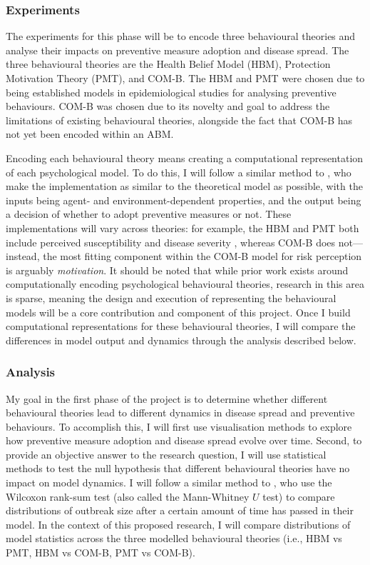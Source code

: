 \subsubsection{Experiments}

The experiments for this phase will be to encode three behavioural theories and analyse their impacts on preventive measure adoption and disease spread. The three behavioural theories are the Health Belief Model (HBM), Protection Motivation Theory (PMT), and COM-B. The HBM and PMT were chosen due to being established models in epidemiological studies for analysing preventive behaviours. COM-B was chosen due to its novelty and goal to address the limitations of existing behavioural theories, alongside the fact that COM-B has not yet been encoded within an ABM.

Encoding each behavioural theory means creating a computational representation of each psychological model. To do this, I will follow a similar method to \citet{abdulkareem_intelligent_2018}, who make the implementation as similar to the theoretical model as possible, with the inputs being agent- and environment-dependent properties, and the output being a decision of whether to adopt preventive measures or not. These implementations will vary across theories: for example, the HBM and PMT both include perceived susceptibility and disease severity \cite{champion_health_2015, norman_protection_2015}, whereas COM-B does not---instead, the most fitting component within the COM-B model for risk perception is arguably \textit{motivation}. It should be noted that while prior work exists around computationally encoding psychological behavioural theories, research in this area is sparse, meaning the design and execution of representing the behavioural models will be a core contribution and component of this project. Once I build computational representations for these behavioural theories, I will compare the differences in model output and dynamics through the analysis described below.

\subsubsection{Analysis}

My goal in the first phase of the project is to determine whether different behavioural theories lead to different dynamics in disease spread and preventive behaviours. To accomplish this, I will first use visualisation methods to explore how preventive measure adoption and disease spread evolve over time. Second, to provide an objective answer to the research question, I will use statistical methods to test the null hypothesis that different behavioural theories have no impact on model dynamics. I will follow a similar method to \citet{hunter_hybrid_2020}, who use the Wilcoxon rank-sum test (also called the Mann-Whitney $U$ test) to compare distributions of outbreak size after a certain amount of time has passed in their model. In the context of this proposed research, I will compare distributions of model statistics across the three modelled behavioural theories (i.e., HBM vs PMT, HBM vs COM-B, PMT vs COM-B).

